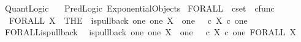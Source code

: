 %
\begin{isabellebody}%
%
%
\isadelimtheory
%
\endisadelimtheory
%
\isatagtheory
{}\isamarkupfalse%
\ Quant{\isacharunderscore}{\kern0pt}Logic\isanewline
\ \ \ Pred{\isacharunderscore}{\kern0pt}Logic\ Exponential{\isacharunderscore}{\kern0pt}Objects\isanewline
{}%
\endisatagtheory
{\isafoldtheory}%
%
\isadelimtheory
%
\endisadelimtheory
%
\isadelimdocument
%
\endisadelimdocument
%
\isatagdocument
%
\isamarkuptrue%
%
\endisatagdocument
{\isafolddocument}%
%
\isadelimdocument
%
\endisadelimdocument
{}\isamarkupfalse%
\ FORALL\ {\isacharcolon}{\kern0pt}{\isacharcolon}{\kern0pt}\ {\isachardoublequoteopen}cset\ {\isasymRightarrow}\ cfunc{\isachardoublequoteclose}\ \isanewline
\ \ {\isachardoublequoteopen}FORALL\ X\ {\isacharequal}{\kern0pt}\ {\isacharparenleft}{\kern0pt}THE\ {\isasymchi}{\isachardot}{\kern0pt}\ is{\isacharunderscore}{\kern0pt}pullback\ one\ one\ {\isacharparenleft}{\kern0pt}{\isasymOmega}\isactrlbsup X\isactrlesup {\isacharparenright}{\kern0pt}\ {\isasymOmega}\ {\isacharparenleft}{\kern0pt}{\isasymbeta}\isactrlbsub one\isactrlesub {\isacharparenright}{\kern0pt}\ {\isasymt}\ {\isacharparenleft}{\kern0pt}{\isacharparenleft}{\kern0pt}{\isasymt}\ {\isasymcirc}\isactrlsub c\ {\isasymbeta}\isactrlbsub X\ {\isasymtimes}\isactrlsub c\ one\isactrlesub {\isacharparenright}{\kern0pt}\isactrlsup {\isasymsharp}{\isacharparenright}{\kern0pt}\ {\isasymchi}{\isacharparenright}{\kern0pt}{\isachardoublequoteclose}\isanewline
\isanewline
{}\isamarkupfalse%
\ FORALL{\isacharunderscore}{\kern0pt}is{\isacharunderscore}{\kern0pt}pullback{\isacharcolon}{\kern0pt}\isanewline
\ \ {\isachardoublequoteopen}is{\isacharunderscore}{\kern0pt}pullback\ one\ one\ {\isacharparenleft}{\kern0pt}{\isasymOmega}\isactrlbsup X\isactrlesup {\isacharparenright}{\kern0pt}\ {\isasymOmega}\ {\isacharparenleft}{\kern0pt}{\isasymbeta}\isactrlbsub one\isactrlesub {\isacharparenright}{\kern0pt}\ {\isasymt}\ {\isacharparenleft}{\kern0pt}{\isacharparenleft}{\kern0pt}{\isasymt}\ {\isasymcirc}\isactrlsub c\ {\isasymbeta}\isactrlbsub X\ {\isasymtimes}\isactrlsub c\ one\isactrlesub {\isacharparenright}{\kern0pt}\isactrlsup {\isasymsharp}{\isacharparenright}{\kern0pt}\ {\isacharparenleft}{\kern0pt}FORALL\ X{\isacharparenright}{\kern0pt}{\isachardoublequoteclose}\isanewline
%
\isadelimproof
\ \ %
\endisadelimproof
%
\isatagproof
{}\isamarkupfalse%

\end{isabellebody}

